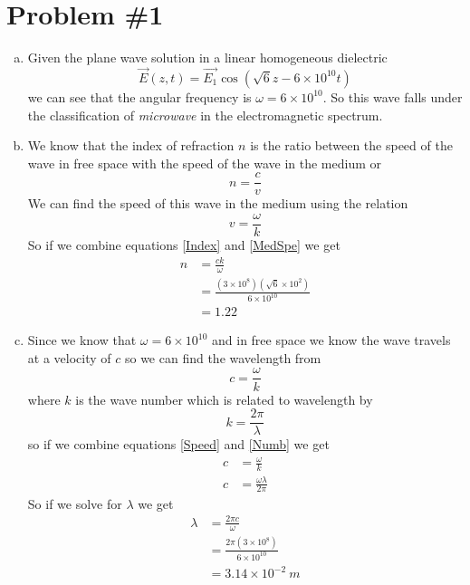 \documentclass[11pt]{article}
\numberwithin{equation}{section}
\begin{document}


\section{Problem \#1}
\begin{enumerate}[(a)]
\item
Given the plane wave solution in a linear homogeneous dielectric
$$\vec{E}(z,t) = \vec{E_1}\cos\left(\sqrt{6}z-6\times10^{10}t\right)$$
we can see that the angular frequency is $\omega=6\times10^{10}$. So this wave falls under the classification of \emph{microwave} in the electromagnetic spectrum.

\item
We know that the index of refraction $n$ is the ratio between the speed of the wave in free space with the speed of the wave in the medium or
\begin{equation}
n = \frac{c}{v}
\label{Index}
\end{equation}
We can find the speed of this wave in the medium using the relation
\begin{equation}
v = \frac{\omega}{k}
\label{MedSpe}
\end{equation}
So if we combine equations \ref{Index} and \ref{MedSpe} we get
\begin{align*}
n &= \frac{ck}{\omega}\\
&= \frac{(3\times10^{8})(\sqrt{6}\times10^{2})}{6\times10^{10}}\\
&= 1.22
\end{align*}

\item
Since we know that $\omega=6\times10^{10}$ and in free space we know the wave travels at a velocity of $c$ so we can find the wavelength from
\begin{equation}
c = \frac{\omega}{k}
\label{Speed}
\end{equation}
where $k$ is the wave number which is related to wavelength by
\begin{equation}
k = \frac{2\pi}{\lambda}
\label{Numb}
\end{equation}
so if we combine equations \ref{Speed} and \ref{Numb} we get
\begin{align*}
c &= \frac{\omega}{k}\\
c &= \frac{\omega\lambda}{2\pi}
\end{align*}
So if we solve for $\lambda$ we get
\begin{align*}
\lambda &= \frac{2\pi c}{\omega} \\
&= \frac{2\pi (3\times10^{8})}{6\times10^{10}} \\
&= 3.14\times10^{-2}\ {m}
\end{align*}


\end{enumerate}
\end{document}
